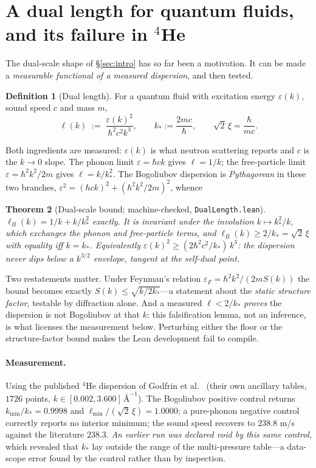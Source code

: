\documentclass[11pt,a4paper]{article}
\newtheorem{theorem}{Theorem}
\theoremstyle{definition}
\newtheorem{definition}[theorem]{Definition}
\theoremstyle{remark}
\newcommand{\lean}[1]{\texttt{\small #1}}
\begin{document}
\section{A dual length for quantum fluids, and its failure in $^4$He}
\label{sec:duallength}

The dual-scale shape of \S\ref{sec:intro} has so far been a motivation. It can be made a
\emph{measurable functional of a measured dispersion}, and then tested.

\begin{definition}[Dual length]
For a quantum fluid with excitation energy $\varepsilon(k)$, sound speed $c$ and mass $m$,
\[
   \ell(k) \;:=\; \frac{\varepsilon(k)^2}{\hbar^2c^2k^3},
   \qquad k_* := \frac{2mc}{\hbar}, \qquad \sqrt2\,\xi = \frac{\hbar}{mc}.
\]
\end{definition}

Both ingredients are measured: $\varepsilon(k)$ is what neutron scattering reports and $c$
is the $k\to0$ slope. The phonon limit $\varepsilon = \hbar ck$ gives $\ell = 1/k$; the
free-particle limit $\varepsilon = \hbar^2k^2/2m$ gives $\ell = k/k_*^2$. The Bogoliubov
dispersion is \emph{Pythagorean} in these two branches,
$\varepsilon^2 = (\hbar ck)^2 + (\hbar^2k^2/2m)^2$, whence

\begin{theorem}[Dual-scale bound; machine-checked, \lean{DualLength.lean}]
\label{thm:duallength}
$\ell_B(k) = 1/k + k/k_*^2$ exactly. It is invariant under the involution
$k \mapsto k_*^2/k$, which exchanges the phonon and free-particle terms, and
$\ell_B(k) \ge 2/k_* = \sqrt2\,\xi$ with equality \emph{iff} $k = k_*$. Equivalently
$\varepsilon(k)^2 \ge (2\hbar^2c^2/k_*)\,k^3$: the dispersion never dips below a
$k^{3/2}$ envelope, tangent at the self-dual point.
\end{theorem}

Two restatements matter. Under Feynman's relation $\varepsilon_F = \hbar^2k^2/(2mS(k))$ the
bound becomes exactly $S(k) \le \sqrt{k/2k_*}$---a statement about the \emph{static structure
factor}, testable by diffraction alone. And a measured $\ell < 2/k_*$ \emph{proves} the
dispersion is not Bogoliubov at that $k$: this falsification lemma, not an inference, is what
licenses the measurement below. Perturbing either the floor or the structure-factor bound
makes the Lean development fail to compile.

\paragraph{Measurement.} Using the published $^4$He dispersion of
Godfrin et al.~\cite{Godfrin2021} (their own ancillary tables, $1726$ points,
$k\in[0.002,3.600]\,\text{\AA}^{-1}$). The Bogoliubov positive control returns
$k_{\min}/k_* = 0.9998$ and $\ell_{\min}/(\sqrt2\,\xi) = 1.0000$; a pure-phonon negative
control correctly reports no interior minimum; the sound speed recovers to $238.8$ m/s
against the literature $238.3$. \emph{An earlier run was declared void by this same control},
which revealed that $k_*$ lay outside the range of the multi-pressure table---a data-scope
error found by the control rather than by inspection.
\end{document}
